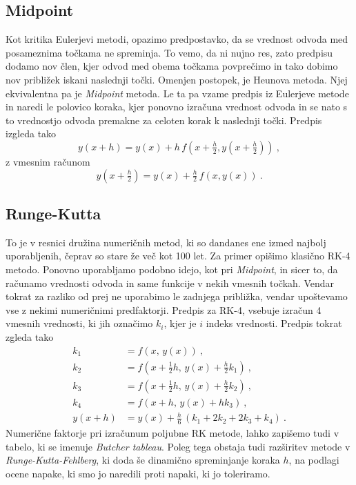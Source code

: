 \documentclass{porocilo}
\begin{document}
\subsection{Midpoint}
Kot kritika Eulerjevi metodi, opazimo predpostavko, da se vrednost odvoda med posameznima točkama ne spreminja. To vemo, da ni nujno res, zato predpisu dodamo nov člen, kjer odvod med obema točkama povprečimo in tako dobimo nov približek iskani naslednji točki. Omenjen postopek, je Heunova metoda. Njej ekvivalentna pa je \textit{Midpoint} metoda. Le ta pa vzame predpis iz Eulerjeve metode in naredi le polovico koraka, kjer ponovno izračuna vrednost odvoda in se nato s to vrednostjo odvoda premakne za celoten korak k naslednji točki. Predpis izgleda tako
\begin{equation}
    y(x+h) = y(x) + h\,f(x+\tfrac{h}{2}, y(x+\tfrac{h}{2})) \>,
    \label{eq:Midpoint}
\end{equation}
z vmesnim računom
\begin{equation*}
    y(x+\tfrac{h}{2}) = y(x) + \tfrac{h}{2}\,f(x, y(x)) \>.
\end{equation*}

\subsection{Runge-Kutta}
To je v resnici družina numeričnih metod, ki so dandanes ene izmed najbolj uporabljenih, čeprav so stare že več kot 100 let. Za primer opišimo klasično RK-4 metodo. Ponovno uporabljamo podobno idejo, kot pri \textit{Midpoint}, in sicer to, da računamo vrednosti odvoda in same funkcije v nekih vmesnih točkah. Vendar tokrat za razliko od prej ne uporabimo le zadnjega približka, vendar upoštevamo vse z nekimi numeričnimi predfaktorji. Predpis za RK-4, vsebuje izračun 4 vmesnih vrednosti, ki jih označimo $k_i$, kjer je $i$ indeks vrednosti. Predpis tokrat zgleda tako
\begin{align}
    k_1      & =
    f\left(x,\,{y}(x)\right) \> {,}\nonumber                      \\
    k_2      & =
    f\left(x+{\tfrac{1}{2}}h,\,
    {y}(x)+{\tfrac{h}{2}}k_1\right) \> {,}\nonumber               \\
    k_3      & =
    f\left(x+{\tfrac{1}{2}}h,\,
    {y}(x)+{\tfrac{h}{2}}k_2\right) \> {,}                        \\
    k_4      & =  f\left(x+h,\,{y}(x)+hk_3\right) \> {,}\nonumber \\
    {y}(x+h) & =  {y}(x)
    + {\tfrac{h}{6}}\,\left(k_1 + 2k_2 + 2k_3 + k_4\right) \>.
    \label{eq:rk4}
\end{align}
Numerične faktorje pri izračunum poljubne RK metode, lahko zapišemo tudi v tabelo, ki se imenuje \textit{Butcher tableau}. Poleg tega obstaja tudi razširitev metode v \textit{Runge-Kutta-Fehlberg}, ki doda še dinamično spreminjanje koraka $h$, na podlagi ocene napake, ki smo jo naredili proti napaki, ki jo toleriramo.
\end{document}
